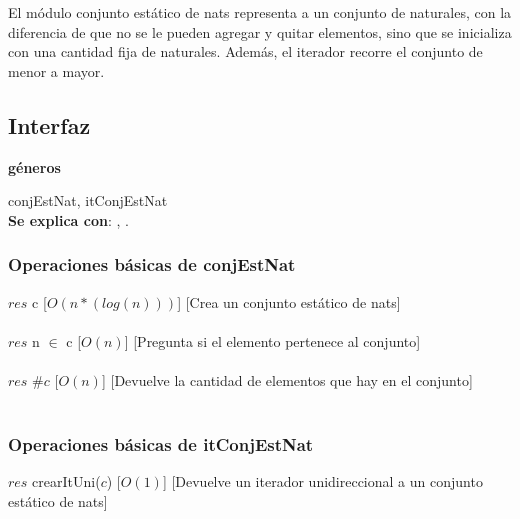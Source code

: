 El m\'odulo conjunto est\'atico de nats representa a un conjunto de naturales, con la diferencia de que no se le pueden agregar y quitar elementos, sino que se inicializa con una cantidad fija de naturales. Adem\'as, el iterador recorre el conjunto de menor a mayor.
\subsection{Interfaz}

   \parbox{1.7cm}{\textbf{g\'eneros}} conjEstNat, itConjEstNat\\

  \textbf{Se explica con}: , .

  \subsubsection{Operaciones b\'asicas de conjEstNat}
  {$res$ \igobs c}
  [$O(n*(log (n)))$]
  [Crea un conjunto est\'atico de nats]\\\\
  
  {$res$ \igobs n $\in$ c}
  [$O(n)$]
  [Pregunta si el elemento pertenece al conjunto]\\\\

  {$res$ \igobs \#$c$}
  [$O(n)$]
  [Devuelve la cantidad de elementos que hay en el conjunto]\\\\  
  \subsubsection{Operaciones b\'asicas de itConjEstNat}  
  
  {$res$ \igobs crearItUni($c$)}
  [$O(1)$]
  [Devuelve un iterador unidireccional a un conjunto est\'atico de nats]\\\\
  
